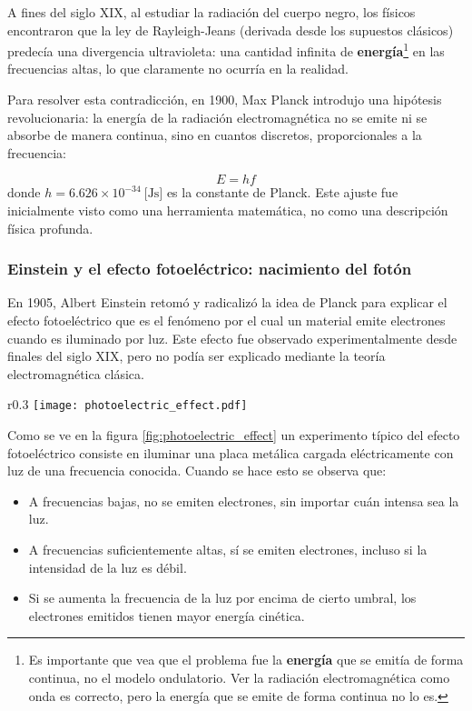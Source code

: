 A fines del siglo XIX, al estudiar la radiación del cuerpo negro, los físicos encontraron que la ley de Rayleigh-Jeans (derivada desde los supuestos clásicos) predecía una divergencia ultravioleta: una cantidad infinita de \textbf{energía}\footnote{Es importante que vea que el problema fue la \textbf{energía} que se emitía de forma continua, no el modelo ondulatorio. Ver la radiación electromagnética como onda es correcto, pero la energía que se emite de forma continua no lo es.} en las frecuencias altas, lo que claramente no ocurría en la realidad.

Para resolver esta contradicción, en 1900, Max Planck introdujo una hipótesis revolucionaria: la energía de la radiación electromagnética no se emite ni se absorbe de manera continua, sino en cuantos discretos, proporcionales a la frecuencia:

\begin{equation}
  E = h f
  \label{eq:planck}
\end{equation}
donde \(h=6.626 \times 10^{-34} \ \text{[Js]}\) es la constante de Planck. Este ajuste fue inicialmente visto como una herramienta matemática, no como una descripción física profunda.

\subsubsection{Einstein y el efecto fotoeléctrico: nacimiento del fotón}

En 1905, Albert Einstein retomó y radicalizó la idea de Planck para explicar el efecto fotoeléctrico que es el fenómeno por el cual un material emite electrones cuando es iluminado por luz. Este efecto fue observado experimentalmente desde finales del siglo XIX, pero no podía ser explicado mediante la teoría electromagnética clásica.

\begin{wrapfigure}{r}{0.3\textwidth}
  \centering
  \texttt{[image: photoelectric\_effect.pdf]}
  \caption{Experimento típico: Se ilumina la superficie de un metal con luz de frecuencia conocida.}
  \label{fig:photoelectric_effect}
\end{wrapfigure}
Como se ve en la figura \ref{fig:photoelectric_effect} un experimento típico del efecto fotoeléctrico consiste en iluminar una placa metálica cargada eléctricamente con luz de una frecuencia conocida. Cuando se hace esto se observa que:
\begin{itemize}
  \item A frecuencias bajas, no se emiten electrones, sin importar cuán intensa sea la luz.
  \item A frecuencias suficientemente altas, sí se emiten electrones, incluso si la intensidad de la luz es débil.
  \item Si se aumenta la frecuencia de la luz por encima de cierto umbral, los electrones emitidos tienen mayor energía cinética.
\end{itemize}

